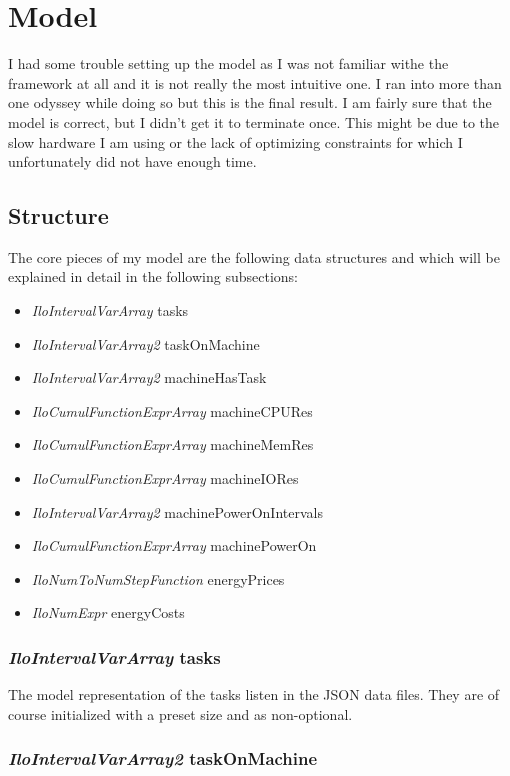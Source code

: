 \section{Model}

I had some trouble setting up the model as I was not familiar withe the framework at all and it is not really the most intuitive one. I ran into more than one odyssey while doing so but this is the final result. I am fairly sure that the model is correct, but I didn't get it to terminate once. This might be due to the slow hardware I am using 
or the lack of optimizing constraints for which I unfortunately did not have enough time.

\subsection{Structure}

The core pieces of my model are the following data structures and which will be explained in detail in the following subsections:

\begin{itemize}
	\item \textit{IloIntervalVarArray} tasks
	\item \textit{IloIntervalVarArray2} taskOnMachine
	\item \textit{IloIntervalVarArray2} machineHasTask
	\item \textit{IloCumulFunctionExprArray} machineCPURes
	\item \textit{IloCumulFunctionExprArray} machineMemRes
	\item \textit{IloCumulFunctionExprArray} machineIORes
	\item \textit{IloIntervalVarArray2} machinePowerOnIntervals
	\item \textit{IloCumulFunctionExprArray} machinePowerOn
	\item \textit{IloNumToNumStepFunction} energyPrices
	\item \textit{IloNumExpr} energyCosts
\end{itemize}

\subsubsection{\textit{IloIntervalVarArray} tasks}

The model representation of the tasks listen in the JSON data files. They are of course initialized 
with a preset size and as non-optional.

\subsubsection{\textit{IloIntervalVarArray2} taskOnMachine}

